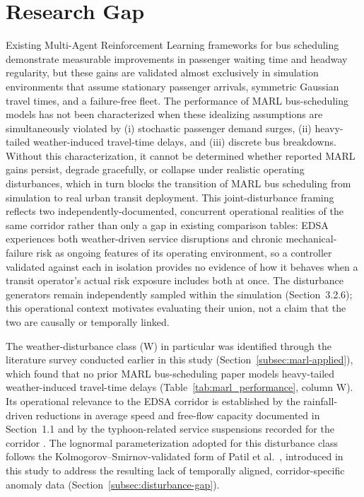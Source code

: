 \section{Research Gap}
Existing Multi-Agent Reinforcement Learning frameworks for bus scheduling demonstrate measurable improvements in passenger waiting time and headway regularity, but these gains are validated almost exclusively in simulation environments that assume stationary passenger arrivals, symmetric Gaussian travel times, and a failure-free fleet. The performance of MARL bus-scheduling models has not been characterized when these idealizing assumptions are simultaneously violated by (i) stochastic passenger demand surges, (ii) heavy-tailed weather-induced travel-time delays, and (iii) discrete bus breakdowns. Without this characterization, it cannot be determined whether reported MARL gains persist, degrade gracefully, or collapse under realistic operating disturbances, which in turn blocks the transition of MARL bus scheduling from simulation to real urban transit deployment. This joint-disturbance framing reflects two independently-documented, concurrent operational realities of the same corridor rather than only a gap in existing comparison tables: EDSA experiences both weather-driven service disruptions \cite{PhilstarTyphoon2024, PIA_Emergency2023} and chronic mechanical-failure risk \cite{Chua2026} as ongoing features of its operating environment, so a controller validated against each in isolation provides no evidence of how it behaves when a transit operator's actual risk exposure includes both at once. The disturbance generators remain independently sampled within the simulation (Section~3.2.6); this operational context motivates evaluating their union, not a claim that the two are causally or temporally linked.

The weather-disturbance class (W) in particular was identified through the literature survey conducted earlier in this study (Section~\ref{subsec:marl-applied}), which found that no prior MARL bus-scheduling paper models heavy-tailed weather-induced travel-time delays (Table~\ref{tab:marl_performance}, column W). Its operational relevance to the EDSA corridor is established by the rainfall-driven reductions in average speed and free-flow capacity documented in Section~1.1 \cite{TSSP_Rain2018} and by the typhoon-related service suspensions recorded for the corridor \cite{DOTr2020Suspension}. The lognormal parameterization adopted for this disturbance class follows the Kolmogorov--Smirnov-validated form of Patil et al.~\cite{Patil2025Conformal}, introduced in this study to address the resulting lack of temporally aligned, corridor-specific anomaly data (Section~\ref{subsec:disturbance-gap}).



